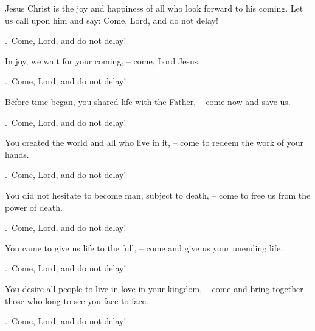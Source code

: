 \lettrine[loversize=0.15,lines=2]{J}{}esus Christ is the joy and happiness of all who look forward to his coming. Let us call upon him and say: Come, Lord, and do not delay!
\par \Rbar.~Come, Lord, and do not delay!

In joy, we wait for your coming,
– come, Lord Jesus.
\par \Rbar.~Come, Lord, and do not delay!

Before time began, you shared life with the Father,
– come now and save us.
\par \Rbar.~Come, Lord, and do not delay!

You created the world and all who live in it,
– come to redeem the work of your hands.
\par \Rbar.~Come, Lord, and do not delay!

You did not hesitate to become man, subject to death,
– come to free us from the power of death.
\par \Rbar.~Come, Lord, and do not delay!

You came to give us life to the full,
– come and give us your unending life.
\par \Rbar.~Come, Lord, and do not delay!

You desire all people to live in love in your kingdom,
– come and bring together those who long to see you face to face.
\par \Rbar.~Come, Lord, and do not delay!
